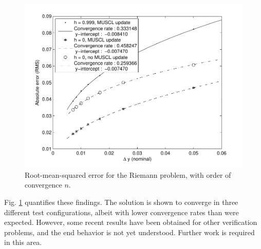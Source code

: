 \documentclass[12pt,letterpaper]{article}
\begin{document}
\begin{figure}[htbp]%
   \centering
   \includegraphics[width=\textwidth]{Riemann_convergence.pdf} 
   \caption[Convergence of Riemann problem]{Root-mean-squared error for the Riemann problem, with order of convergence $n$.}
   \label{fig:riemann_convergence}
\end{figure}

Fig. \ref{fig:riemann_convergence} quantifies these findings. The solution is shown to converge in three different test configurations, albeit with lower convergence rates than were expected.
However, some recent results have been obtained for other verification
problems, and the end behavior is not yet understood. Further work is
required in this area. 

\end{document}
